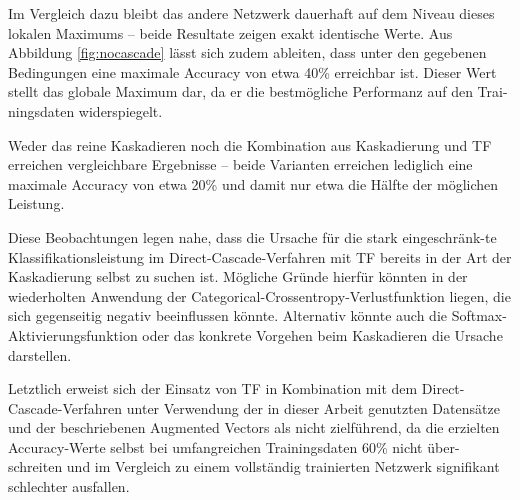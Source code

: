 Im Vergleich dazu bleibt das andere Netzwerk dauerhaft auf dem Niveau dieses lokalen Maximums – beide Resultate zeigen exakt identische Werte. 
Aus Abbildung \ref{fig:nocascade} lässt sich zudem ableiten, dass unter den gegebenen Bedingungen eine maximale Accuracy von etwa 40\% erreichbar 
ist. Dieser Wert stellt das globale Maximum dar, da er die bestmögliche Performanz auf den Trai-ningsdaten widerspiegelt.

Weder das reine Kaskadieren noch die Kombination aus Kaskadierung und TF erreichen vergleichbare Ergebnisse – beide Varianten 
erreichen lediglich eine maximale Accuracy von etwa 20\% und damit nur etwa die Hälfte der möglichen Leistung.

Diese Beobachtungen legen nahe, dass die Ursache für die stark eingeschränk-te Klassifikationsleistung im Direct-Cascade-Verfahren mit 
TF bereits in der Art der Kaskadierung selbst zu suchen ist. Mögliche Gründe hierfür könnten in der wiederholten Anwendung der 
Categorical-Crossentropy-Verlustfunktion liegen, die sich gegenseitig negativ beeinflussen könnte. Alternativ könnte auch die 
Softmax-Aktivierungsfunktion oder das konkrete Vorgehen beim Kaskadieren die Ursache darstellen.

Letztlich erweist sich der Einsatz von TF in Kombination mit dem Direct-Cascade-Verfahren unter Verwendung der in dieser Arbeit 
genutzten Datensätze und der beschriebenen Augmented Vectors als nicht zielführend, da die erzielten Accuracy-Werte selbst bei umfangreichen 
Trainingsdaten 60\% nicht über-schreiten und im Vergleich zu einem vollständig trainierten Netzwerk signifikant schlechter ausfallen.
